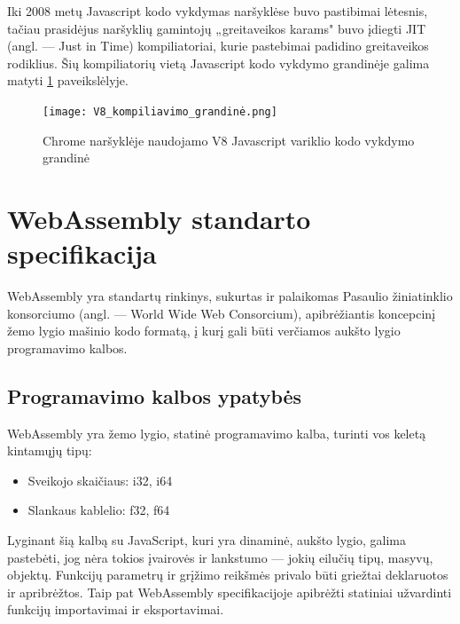 \documentclass{VUMIFPSkursinis}
\begin{document}
Iki 2008 metų Javascript kodo vykdymas naršyklėse buvo pastibimai lėtesnis, tačiau prasidėjus naršyklių gamintojų „greitaveikos karams" buvo įdiegti JIT (angl. — Just in Time) kompiliatoriai, kurie pastebimai padidino greitaveikos rodiklius. Šių kompiliatorių vietą Javascript kodo vykdymo grandinėje galima matyti \ref{fig:v8_pipeline} paveikslėlyje.

\begin{figure}[h!]
  \begin{center}
  \texttt{[image: V8\_kompiliavimo\_grandinė.png]}
  \end{center}
  \caption{Chrome naršyklėje naudojamo V8 Javascript variklio kodo vykdymo grandinė}
  \label{fig:v8_pipeline}
\end{figure}

\section{WebAssembly standarto specifikacija}

WebAssembly yra standartų rinkinys, sukurtas ir palaikomas Pasaulio žiniatinklio konsorciumo (angl. — World Wide Web Consorcium), apibrėžiantis koncepcinį žemo lygio mašinio kodo formatą, į kurį gali būti verčiamos aukšto lygio programavimo kalbos.

\subsection{Programavimo kalbos ypatybės}
WebAssembly yra žemo lygio, statinė programavimo kalba, turinti vos keletą kintamųjų tipų:

\begin{itemize}
    \item Sveikojo skaičiaus: i32, i64
    \item Slankaus kablelio: f32, f64
\end{itemize}

Lyginant šią kalbą su JavaScript, kuri yra dinaminė, aukšto lygio, galima pastebėti, jog nėra tokios įvairovės ir lankstumo — jokių eilučių tipų, masyvų, objektų. Funkcijų parametrų ir grįžimo reikšmės privalo būti griežtai deklaruotos ir apribrėžtos. Taip pat WebAssembly specifikacijoje apibrėžti statiniai užvardinti funkcijų importavimai ir eksportavimai.
\end{document}
